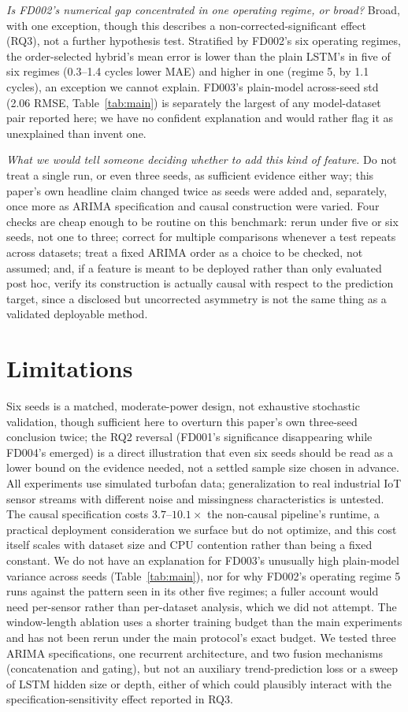 \documentclass[conference]{IEEEtran}
\begin{document}
\emph{Is FD002's numerical gap concentrated in one operating regime, or broad?} Broad, with one exception, though this describes a non-corrected-significant effect (RQ3), not a further hypothesis test. Stratified by FD002's six operating regimes, the order-selected hybrid's mean error is lower than the plain LSTM's in five of six regimes (0.3--1.4 cycles lower MAE) and higher in one (regime 5, by 1.1 cycles), an exception we cannot explain. FD003's plain-model across-seed std (2.06 RMSE, Table~\ref{tab:main}) is separately the largest of any model-dataset pair reported here; we have no confident explanation and would rather flag it as unexplained than invent one.

\emph{What we would tell someone deciding whether to add this kind of feature.} Do not treat a single run, or even three seeds, as sufficient evidence either way; this paper's own headline claim changed twice as seeds were added and, separately, once more as ARIMA specification and causal construction were varied. Four checks are cheap enough to be routine on this benchmark: rerun under five or six seeds, not one to three; correct for multiple comparisons whenever a test repeats across datasets; treat a fixed ARIMA order as a choice to be checked, not assumed; and, if a feature is meant to be deployed rather than only evaluated post hoc, verify its construction is actually causal with respect to the prediction target, since a disclosed but uncorrected asymmetry is not the same thing as a validated deployable method.

\section{Limitations}
Six seeds is a matched, moderate-power design, not exhaustive stochastic validation, though sufficient here to overturn this paper's own three-seed conclusion twice; the RQ2 reversal (FD001's significance disappearing while FD004's emerged) is a direct illustration that even six seeds should be read as a lower bound on the evidence needed, not a settled sample size chosen in advance. All experiments use simulated turbofan data; generalization to real industrial IoT sensor streams with different noise and missingness characteristics is untested. The causal specification costs $3.7$--$10.1\times$ the non-causal pipeline's runtime, a practical deployment consideration we surface but do not optimize, and this cost itself scales with dataset size and CPU contention rather than being a fixed constant. We do not have an explanation for FD003's unusually high plain-model variance across seeds (Table~\ref{tab:main}), nor for why FD002's operating regime 5 runs against the pattern seen in its other five regimes; a fuller account would need per-sensor rather than per-dataset analysis, which we did not attempt. The window-length ablation uses a shorter training budget than the main experiments and has not been rerun under the main protocol's exact budget. We tested three ARIMA specifications, one recurrent architecture, and two fusion mechanisms (concatenation and gating), but not an auxiliary trend-prediction loss or a sweep of LSTM hidden size or depth, either of which could plausibly interact with the specification-sensitivity effect reported in RQ3.
\end{document}
